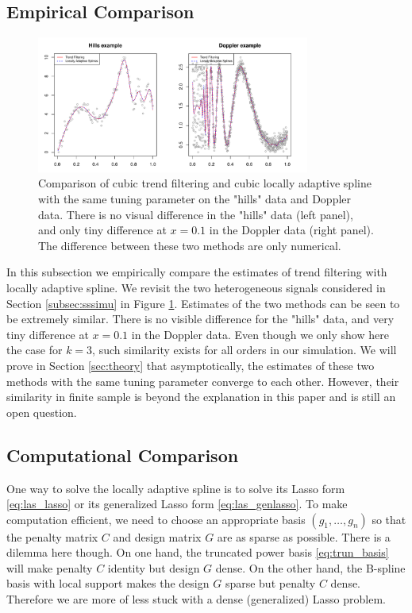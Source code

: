 \documentclass[a4paper]{article}
\begin{document}
\subsection{Empirical Comparison}
\label{subsec:emplasvstf}

\begin{figure}[t!]
\centering
\includegraphics[width = 0.8\textwidth]{Figures/Figure7.pdf}
\caption{Comparison of cubic trend filtering and cubic locally adaptive spline with the same tuning parameter on the "hills" data and Doppler data. There is no visual difference in the "hills" data (left panel), and only tiny difference at $x= 0.1$ in the Doppler data (right panel). The difference between these two methods are only numerical.}
\label{fig:Figure7_lasvstf}
\end{figure}

In this subsection we empirically compare the estimates of trend filtering with locally adaptive spline. We revisit the two heterogeneous signals considered in Section \ref{subsec:sssimu} in Figure \ref{fig:Figure7_lasvstf}. Estimates of the two methods can be seen to be extremely similar. There is no visible difference for the "hills" data, and very tiny difference at $x = 0.1$ in the Doppler data. Even though we only show here the case for $k = 3$, such similarity exists for all orders in our simulation. We will prove in Section \ref{sec:theory} that asymptotically, the estimates of these two methods with the same tuning parameter converge to each other. However, their similarity in finite sample is beyond the explanation in this paper and is still an open question.

\subsection{Computational Comparison}
One way to solve the locally adaptive spline is to solve its Lasso form \eqref{eq:las_lasso} or its generalized Lasso form \eqref{eq:las_genlasso}. To make computation efficient, we need to choose an appropriate basis $(g_1,\ldots,g_n)$ so that the penalty matrix $C$ and design matrix $G$ are as sparse as possible. There is a dilemma here though. On one hand, the truncated power basis \eqref{eq:trun_basis} will make penalty $C$ identity but design $G$ dense. On the other hand, the B-spline basis with local support makes the design $G$ sparse but penalty $C$ dense. Therefore we are more of less stuck with a dense (generalized) Lasso problem.
\end{document}
